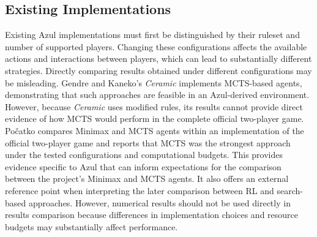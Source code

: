 \subsection{Existing Implementations}
Existing Azul implementations must first be distinguished by their ruleset and number of supported players. Changing these configurations affects the available actions and interactions between players, which can lead to substantially different strategies. Directly comparing results obtained under different configurations may be misleading. Gendre and Kaneko's \emph{Ceramic} \cite{ceramic} implements MCTS-based agents, demonstrating that such approaches are feasible in an Azul-derived environment. However, because \emph{Ceramic} uses modified rules, its results cannot provide direct evidence of how MCTS would perform in the complete official two-player game. \\

Počatko \cite{pocatko2021azul} compares Minimax and MCTS agents within an implementation of the official two-player game and reports that MCTS was the strongest approach under the tested configurations and computational budgets. This provides evidence specific to Azul that can inform expectations for the comparison between the project's Minimax and MCTS agents. It also offers an external reference point when interpreting the later comparison between RL and search-based approaches. However, numerical results should not be used directly in results comparison because differences in implementation choices and resource budgets may substantially affect performance. \\

